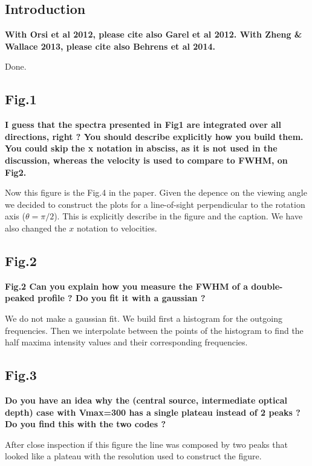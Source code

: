 \documentclass[12pt]{article}
\begin{document}
\subsection*{Introduction}

{\bf With Orsi et al 2012, please cite also Garel et al 2012. With
  Zheng \& Wallace 2013, please cite also Behrens et al 2014.} 

Done.

\subsection*{Fig.1}

{\bf I guess that the spectra presented in Fig1 are integrated over
  all directions, right ? You should describe explicitly how you build
  them. You could skip the x notation in absciss, as it is not used in
  the discussion, whereas the velocity is used to compare to FWHM, on
  Fig2.} 

Now this figure is the Fig.4 in the paper. Given the depence on the
viewing angle we decided to construct the plots for a line-of-sight
perpendicular to the rotation axis ($\theta=\pi/2$). This is
explicitly describe in the figure and the caption. We have also
changed the $x$ notation to velocities.

\subsection*{Fig.2}

{\bf Fig.2 Can you explain how you measure the FWHM of a double-peaked
  profile ? Do you fit it with a gaussian ?} 


We do not make a gaussian fit. We build first a histogram for the
outgoing frequencies. Then we interpolate between the points of the
histogram to find the half maxima intensity values and their
corresponding frequencies.

\subsection*{Fig.3}

{\bf Do you have an idea why the (central source, intermediate optical
  depth) case with Vmax=300 has a single plateau instead of 2 peaks ?
  Do you find this with the two codes ?} 

After close inspection if this figure the line was composed by two 
peaks that looked like a plateau with the resolution used to
construct the figure. 
\end{document}
